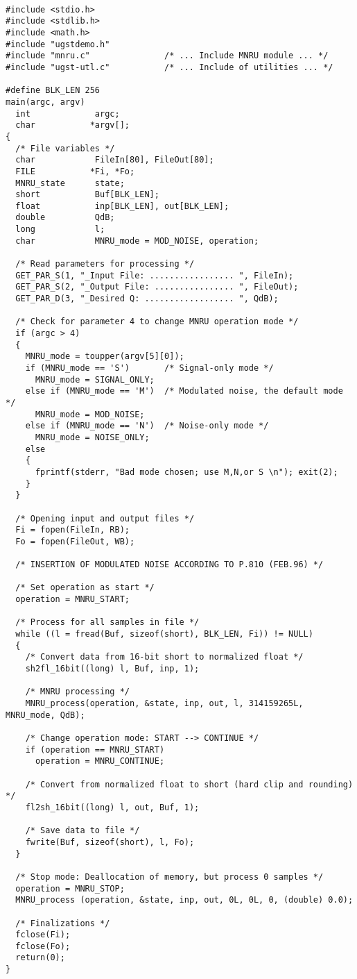 {\tt\small
\begin{verbatim}
#include <stdio.h>
#include <stdlib.h>
#include <math.h>
#include "ugstdemo.h"
#include "mnru.c"               /* ... Include MNRU module ... */
#include "ugst-utl.c"           /* ... Include of utilities ... */

#define BLK_LEN 256
main(argc, argv)
  int             argc;
  char           *argv[];
{
  /* File variables */
  char            FileIn[80], FileOut[80];
  FILE           *Fi, *Fo;
  MNRU_state      state;
  short           Buf[BLK_LEN];
  float           inp[BLK_LEN], out[BLK_LEN];
  double          QdB;
  long            l;
  char            MNRU_mode = MOD_NOISE, operation;

  /* Read parameters for processing */
  GET_PAR_S(1, "_Input File: ................. ", FileIn);
  GET_PAR_S(2, "_Output File: ................ ", FileOut);
  GET_PAR_D(3, "_Desired Q: .................. ", QdB);

  /* Check for parameter 4 to change MNRU operation mode */
  if (argc > 4)
  {
    MNRU_mode = toupper(argv[5][0]);
    if (MNRU_mode == 'S')       /* Signal-only mode */
      MNRU_mode = SIGNAL_ONLY;
    else if (MNRU_mode == 'M')  /* Modulated noise, the default mode */
      MNRU_mode = MOD_NOISE;
    else if (MNRU_mode == 'N')  /* Noise-only mode */
      MNRU_mode = NOISE_ONLY;
    else
    {
      fprintf(stderr, "Bad mode chosen; use M,N,or S \n"); exit(2);
    }
  }

  /* Opening input and output files */
  Fi = fopen(FileIn, RB);
  Fo = fopen(FileOut, WB);

  /* INSERTION OF MODULATED NOISE ACCORDING TO P.810 (FEB.96) */

  /* Set operation as start */
  operation = MNRU_START;

  /* Process for all samples in file */
  while ((l = fread(Buf, sizeof(short), BLK_LEN, Fi)) != NULL)
  {
    /* Convert data from 16-bit short to normalized float */
    sh2fl_16bit((long) l, Buf, inp, 1);

    /* MNRU processing */
    MNRU_process(operation, &state, inp, out, l, 314159265L, MNRU_mode, QdB);

    /* Change operation mode: START --> CONTINUE */
    if (operation == MNRU_START)
      operation = MNRU_CONTINUE;

    /* Convert from normalized float to short (hard clip and rounding) */
    fl2sh_16bit((long) l, out, Buf, 1);

    /* Save data to file */
    fwrite(Buf, sizeof(short), l, Fo);
  }

  /* Stop mode: Deallocation of memory, but process 0 samples */
  operation = MNRU_STOP;
  MNRU_process (operation, &state, inp, out, 0L, 0L, 0, (double) 0.0);

  /* Finalizations */
  fclose(Fi);
  fclose(Fo);
  return(0);
}
\end{verbatim}
}
